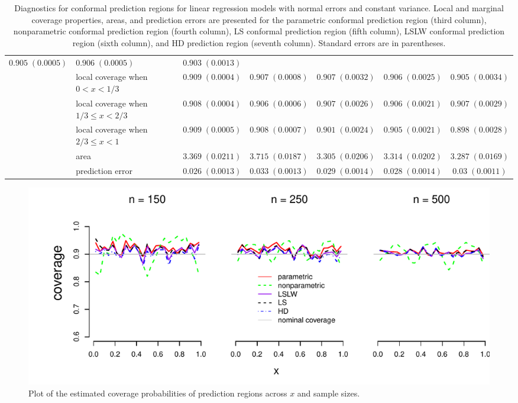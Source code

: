 \documentclass[11pt]{article}\usepackage[]{graphicx}\usepackage[]{color}
\makeatletter
\def\maxwidth{ %
  \ifdim\Gin@nat@width>\linewidth
    \linewidth
  \else
    \Gin@nat@width
  \fi
}
\newenvironment{knitrout}{}{} %
\makeatother
\begin{document}
\begin{table}[h!]
\begin{center}
\begin{tabular}{llccccc}
  $0.905 \; (0.0005)$ & 
  $0.906 \; (0.0005)$ & 
  $0.903 \; (0.0013)$ \\
    & local coverage when $0 < x < 1/3$ & 
  $0.909 \; (0.0004)$ & 
  $0.907 \; (0.0008)$ & 
  $0.907 \; (0.0032)$ & 
  $0.906 \; (0.0025)$ & 
  $0.905 \; (0.0034)$ \\
    & local coverage when $1/3 \leq x < 2/3$ & 
  $0.908 \; (0.0004)$ & 
  $0.906 \; (0.0006)$ & 
  $0.907 \; (0.0026)$ & 
  $0.906 \; (0.0021)$ & 
  $0.907 \; (0.0029)$ \\
    & local coverage when $2/3 \leq x < 1$ & 
  $0.909 \; (0.0005)$ & 
  $0.908 \; (0.0007)$ & 
  $0.901 \; (0.0024)$ & 
  $0.905 \; (0.0021)$ & 
  $0.898 \; (0.0028)$ \\
    & area & 
  $3.369 \; (0.0211)$ & 
  $3.715 \; (0.0187)$ & 
  $3.305 \; (0.0206)$ & 
  $3.314 \; (0.0202)$ & 
  $3.287 \; (0.0169)$ \\
    & prediction error & 
  $0.026 \; (0.0013)$ & 
  $0.033 \; (0.0013)$ & 
  $0.029 \; (0.0014)$ & 
  $0.028 \; (0.0014)$ & 
  $0.03 \; (0.0011)$ 
\end{tabular}
\end{center}
\caption{Diagnostics for conformal prediction regions for linear regression 
  models with normal errors and constant variance.  Local and marginal 
  coverage properties, areas, and prediction errors are presented for the 
    parametric conformal prediction region (third column),
    nonparametric conformal prediction region (fourth column),
    LS conformal prediction region (fifth column), 
    LSLW conformal prediction region (sixth column), and 
    HD prediction region (seventh column). Standard errors are in parentheses.}
\label{Tab:regression-results}
\end{table}





\newpage
\begin{figure}[h!]
\begin{center}
\begin{knitrout}
\color{fgcolor}
\includegraphics[width=\maxwidth]{figure/Fig-regression-inx-500-1} 

\end{knitrout}
\end{center}
\caption{Plot of the estimated coverage probabilities of prediction regions 
  across $x$ and sample sizes.}
\label{Fig:regresion.inx}
\end{figure}
\end{document}
